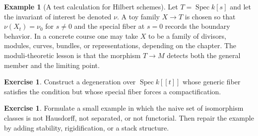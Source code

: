 \documentclass[11pt]{amsart}
\theoremstyle{definition}
\newtheorem{example}[theorem]{Example}
\newtheorem{exercise}[theorem]{Exercise}
\newcommand{\Spec}{\operatorname{Spec}}
\begin{document}
\begin{example}[A test calculation for Hilbert schemes]
Let $T=\Spec k[s]$ and let the invariant of interest be denoted $\nu$.  A toy family $X\to T$ is chosen so that $\nu(X_t)=\nu_0$ for $s\ne0$ and the special fiber at $s=0$ records the boundary behavior.  In a concrete course one may take $X$ to be a family of divisors, modules, curves, bundles, or representations, depending on the chapter.  The moduli-theoretic lesson is that the morphism $T\to M$ detects both the general member and the limiting point.
\end{example}
\begin{exercise}
Construct a degeneration over $\Spec k[[t]]$ whose generic fiber satisfies the condition but whose special fiber forces a compactification.
\end{exercise}
\begin{exercise}
Formulate a small example in which the naive set of isomorphism classes is not Hausdorff, not separated, or not functorial.  Then repair the example by adding stability, rigidification, or a stack structure.
\end{exercise}
\clearpage
\end{document}
